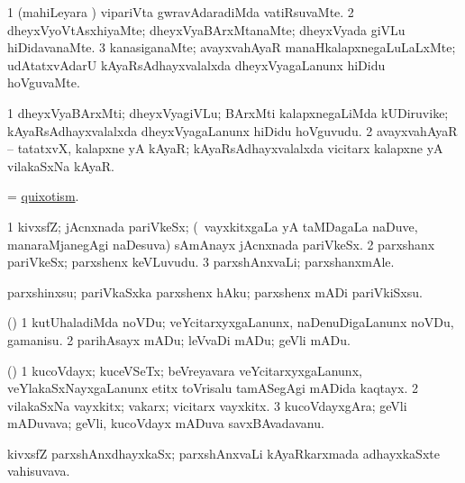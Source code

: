 \bentry
{}
\gl{\kirxvi}
\bmng
\bnum
\num{1} (mahiLeyara \vi) vipariVta gwravAdaradiMda vatiRsuvaMte. 
\num{2} dheyxVyoVtAsxhiyaMte; dheyxVyaBArxMtanaMte; dheyxVyada giVLu hiDidavanaMte. 
\num{3} kanasiganaMte; avayxvahAyaR manaHkalapxnegaLuLaLxMte; udAtatxvAdarU kAyaRsAdhayxvalalxda dheyxVyagaLanunx hiDidu hoVguvaMte. 
\enum
\emng
\eentry

\bentry
{}
\gl{\nA}
\bmng
\bnum
\num{1} dheyxVyaBArxMti; dheyxVyagiVLu; BArxMti kalapxnegaLiMda kUDiruvike; kAyaRsAdhayxvalalxda dheyxVyagaLanunx hiDidu hoVguvudu. 
\num{2} avayxvahAyaR -- tatatxvX, kalapxne yA kAyaR; kAyaRsAdhayxvalalxda vicitarx kalapxne yA vilakaSxNa kAyaR. 
\enum
\emng
\eentry

\bentry
{}
\gl{\nA}
\bmng
= \hyperlink{quixotism}{quixotism}. 
\emng
\eentry

\bentry
{}
\gl{\nA}
\bmng
\bnum
\num{1} kivxsfZ; jAcnxnada pariVkeSx; (\kanmu\ vayxkitxgaLa yA taMDagaLa naDuve, manaraMjanegAgi naDesuva) sAmAnayx jAcnxnada pariVkeSx. 
\num{2} parxshanx pariVkeSx; parxshenx keVLuvudu. 
\num{3} parxshAnxvaLi; parxshanxmAle. 
\enum
\emng
\eentry

\bentry
{}
\gl{\sakirx}
\bmng
parxshinxsu; pariVkaSxka parxshenx hAku; parxshenx mADi pariVkiSxsu. 
\emng
\eentry

\bentry
{}
\gl{\sakirx}
\bmng
(\pArxparx) 
\bnum
\num{1} kutUhaladiMda noVDu; veYcitarxyxgaLanunx, naDenuDigaLanunx noVDu, gamanisu. 
\num{2} parihAsayx mADu; leVvaDi mADu; geVli mADu. 
\enum
\emng
\eentry

\bentry
{}
\gl{\nA}
\bmng
(\pArxparx) 
\bnum
\num{1} kucoVdayx; kuceVSeTx; beVreyavara veYcitarxyxgaLanunx, veYlakaSxNayxgaLanunx etitx toVrisalu tamASegAgi mADida kaqtayx. 
\num{2} vilakaSxNa vayxkitx; vakarx; vicitarx vayxkitx. 
\num{3} kucoVdayxgAra; geVli mADuvava; geVli, kucoVdayx mADuva savxBAvadavanu. 
\enum
\emng
\eentry

\bentry
{}
\gl{\nA}
\bmng
kivxsfZ parxshAnxdhayxkaSx; parxshAnxvaLi kAyaRkarxmada adhayxkaSxte vahisuvava. 
\emng
\eentry

